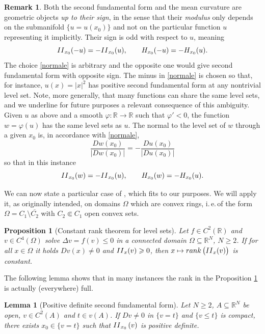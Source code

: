 \documentclass[12pt]{amsart}
\numberwithin{equation}{section}
\theoremstyle{plain}
\newtheorem{lemma}[theorem]{Lemma}
\theoremstyle{plain}
\newtheorem{proposition}[theorem]{Proposition}
\theoremstyle{plain}
\theoremstyle{definition}
\newtheorem{remark}[theorem]{Remark}
\newcommand{\R}{{\mathbb R}}
\renewcommand{\le}{\leqslant}
\renewcommand{\ge}{\geqslant}
\begin{document}
\begin{remark}
\label{rem_curvature}
Both the second fundamental form and the mean curvature are geometric objects {\em up to their sign}, in the sense that their {\em modulus} only depends on the submanifold $\{u=u(x_0)\}$ and not on the particular function $u$ representing it implicitly. 
Their sign is odd with respect to $u$, meaning
\[
{\rm II}_{x_0}(-u)=-{\rm II}_{x_0} (u), \qquad H_{x_0}(-u)=-H_{x_0}(u).
\]
 The choice \eqref{normale} is arbitrary and the opposite one would give second fundamental form with opposite sign. 
The minus in \eqref{normale} is chosen so that, for instance, $u(x)=|x|^2$ has positive second fundamental form at any nontrivial level set. 
Note, more generally, that many functions can share the same level sets, and we underline for future purposes a relevant consequence of this ambiguity. 
Given $u$ as above and a smooth $\varphi:\R\to \R$ such that $\varphi'<0$, the function $w=\varphi(u)$ has the same level sets as $u$. 
The normal to the level set of $w$ through a given $x_0$ is, in accordance with \eqref{normale}, 
\[
\frac{Dw(x_0)}{|Dw(x_0)|}=-\frac{Du(x_0)}{|Du(x_0)|}
\]
so that in this instance
\[
{\rm II}_{x_0}(w)=-{\rm II}_{x_0}(u), \qquad H_{x_0}(w)=-H_{x_0}(u).
\]
\end{remark}

We can now state a particular case of \cite[Theorem 1]{Kor90}, which fits to our purposes. 
We will apply it, as originally intended, on domains $\Omega$ which are convex rings, i.\,e.\,of the form $\Omega=C_1\setminus \overline{C_2}$ with $C_2\Subset C_1$ open convex sets.

\begin{proposition}[Constant rank theorem for level sets]
\label{kore90}
Let $f\in C^2(\R)$ and $v\in C^4(\Omega)$ solve $\Delta v=f(v)\le 0$ in a connected domain $\Omega\subseteq \R^N$, $N\ge 2$. 
If for all $x\in \Omega$ it holds $Dv(x)\ne 0$ and ${\rm II}_x(v)\ge 0$, then $x\mapsto {\rm rank}\, \big({\rm II}_{x}(v)\big)$ is constant.
\end{proposition}

The following lemma shows that in many instances the rank in the Proposition \ref{kore90} is actually (everywhere) full. 

\begin{lemma} 
[Positive definite second fundamental form]
\label{lem_bas_fund_form}
Let $N\ge 2$, $A\subseteq \R^N$ be open, $v\in C^2(A)$ and $t\in v(A)$. 
If $Dv\ne 0$ in $\{v=t\}$ and $\{v\le t\}$ is compact, there exists $x_0\in \{v=t\}$ such that ${\rm II}_{x_0}\, (v)$ is positive definite.
\end{lemma}
\end{document}
